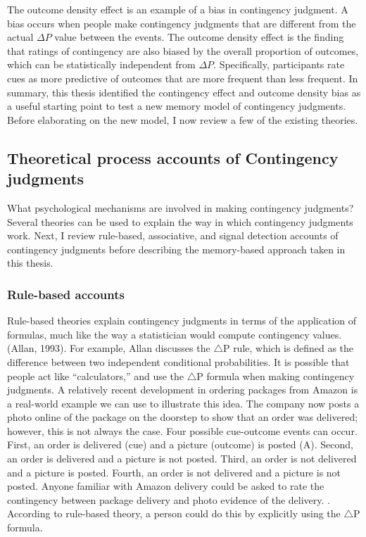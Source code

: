 \documentclass[
  english,
  man,floatsintext]{apa6}
\begin{document}
The outcome density effect is an example of a bias in contingency judgment. A bias occurs when people make contingency judgments that are different from the actual \(\Delta P\) value between the events. The outcome density effect is the finding that ratings of contingency are also biased by the overall proportion of outcomes, which can be statistically independent from \(\Delta P\). Specifically, participants rate cues as more predictive of outcomes that are more frequent than less frequent. In summary, this thesis identified the contingency effect and outcome density bias as a useful starting point to test a new memory model of contingency judgments. Before elaborating on the new model, I now review a few of the existing theories.

\hypertarget{theoretical-process-accounts-of-contingency-judgments}{%
\subsection{Theoretical process accounts of Contingency judgments}\label{theoretical-process-accounts-of-contingency-judgments}}

What psychological mechanisms are involved in making contingency judgments? Several theories can be used to explain the way in which contingency judgments work. Next, I review rule-based, associative, and signal detection accounts of contingency judgments before describing the memory-based approach taken in this thesis.

\hypertarget{rule-based-accounts}{%
\subsubsection{Rule-based accounts}\label{rule-based-accounts}}

Rule-based theories explain contingency judgments in terms of the application of formulas, much like the way a statistician would compute contingency values. (Allan, 1993). For example, Allan discusses the \(\triangle\)P rule, which is defined as the difference between two independent conditional probabilities. It is possible that people act like ``calculators,'' and use the \(\triangle\)P formula when making contingency judgments. A relatively recent development in ordering packages from Amazon is a real-world example we can use to illustrate this idea. The company now posts a photo online of the package on the doorstep to show that an order was delivered; however, this is not always the case. Four possible cue-outcome events can occur. First, an order is delivered (cue) and a picture (outcome) is posted (A). Second, an order is delivered and a picture is not posted. Third, an order is not delivered and a picture is posted. Fourth, an order is not delivered and a picture is not posted. Anyone familiar with Amazon delivery could be asked to rate the contingency between package delivery and photo evidence of the delivery. . According to rule-based theory, a person could do this by explicitly using the \(\triangle\)P formula.
\end{document}
